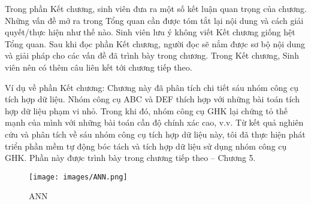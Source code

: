 Trong phần Kết chương, sinh viên đưa ra một số kết luận quan trọng của chương. Những vấn đề mở ra trong Tổng quan cần được tóm tắt lại nội dung và cách giải quyết/thực hiện như thế nào. Sinh viên lưu ý không viết Kết chương giống hệt Tổng quan. Sau khi đọc phần Kết chương, người đọc sẽ nắm được sơ bộ nội dung và giải pháp cho các vấn đề đã trình bày trong chương. Trong Kết chương, Sinh viên nên có thêm câu liên kết tới chương tiếp theo.

Ví dụ về phần Kết chương: Chương này đã phân tích chi tiết sáu nhóm công cụ tích hợp dữ liệu. Nhóm công cụ ABC và DEF thích hợp với những bài toán tích hợp dữ liệu phạm vi nhỏ. Trong khi đó, nhóm công cụ GHK lại chứng tỏ thế mạnh của mình với những bài toán cần độ chính xác cao, v.v. Từ kết quả nghiên cứu và phân tích về sáu nhóm công cụ tích hợp dữ liệu này, tôi đã thực hiện phát triển phần mềm tự động bóc tách và tích hợp dữ liệu sử dụng nhóm công cụ GHK. Phần này được trình bày trong chương tiếp theo – Chương 5.

\begin{figure}[H]
  \centering
  \texttt{[image: images/ANN.png]}
  \caption{ANN}
  \label{fig:ANN}
\end{figure}
